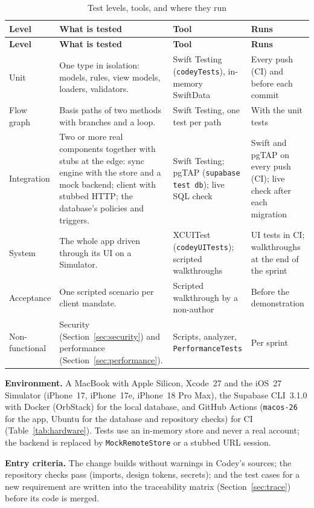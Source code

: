 \documentclass[12pt,letterpaper]{article}
\begin{document}
\begin{xltabular}{\textwidth}{@{}L{2.2cm} Y L{3.6cm} L{2.6cm}@{}}
\caption{Test levels, tools, and where they run}\label{tab:testlevels}\\
\toprule
\textbf{Level} & \textbf{What is tested} & \textbf{Tool} & \textbf{Runs} \\
\midrule
\endfirsthead
\toprule
\textbf{Level} & \textbf{What is tested} & \textbf{Tool} & \textbf{Runs} \\
\midrule
\endhead
\bottomrule
\endfoot
Unit & One type in isolation: models, rules, view models, loaders, validators. & Swift Testing (\texttt{codeyTests}), in-memory SwiftData & Every push (CI) and before each commit \\
Flow graph & Basis paths of two methods with branches and a loop. & Swift Testing, one test per path & With the unit tests \\
Integration & Two or more real components together with stubs at the edge: sync engine with the store and a mock backend; client with stubbed HTTP; the database's policies and triggers. & Swift Testing; pgTAP (\texttt{supabase test db}); live SQL check & Swift and pgTAP on every push (CI); live check after each migration \\
System & The whole app driven through its UI on a Simulator. & XCUITest (\texttt{codeyUITests}); scripted walkthroughs & UI tests in CI; walkthroughs at the end of the sprint \\
Acceptance & One scripted scenario per client mandate. & Scripted walkthrough by a non-author & Before the demonstration \\
Non-functional & Security (Section~\ref{sec:security}) and performance (Section~\ref{sec:performance}). & Scripts, analyzer, \texttt{PerformanceTests} & Per sprint \\
\end{xltabular}

\textbf{Environment.} A MacBook with Apple Silicon, Xcode~27 and the iOS~27
Simulator (iPhone~17, iPhone~17e, iPhone~18 Pro Max), the Supabase CLI~3.1.0 with
Docker (OrbStack) for the local database, and GitHub Actions (\texttt{macos-26} for
the app, Ubuntu for the database and repository checks) for CI
(Table~\ref{tab:hardware}). Tests use an in-memory store and never a real account;
the backend is replaced by \texttt{MockRemoteStore} or a stubbed URL session.

\textbf{Entry criteria.} The change builds without warnings in Codey's sources; the
repository checks pass (imports, design tokens, secrets); and the test cases for a new
requirement are written into the traceability matrix (Section~\ref{sec:trace}) before
its code is merged.
\end{document}
